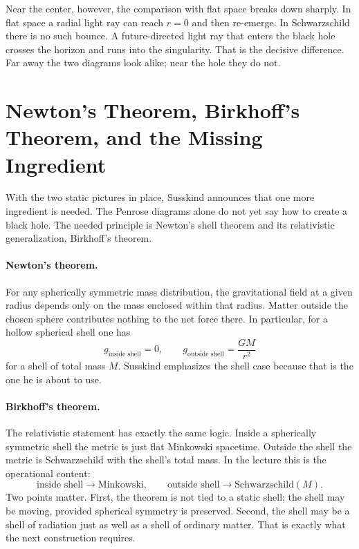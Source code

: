 Near the center, however, the comparison with flat space breaks down sharply. In flat space a radial light ray can reach \(r=0\) and then re-emerge. In Schwarzschild there is no such bounce. A future-directed light ray that enters the black hole crosses the horizon and runs into the singularity. That is the decisive difference. Far away the two diagrams look alike; near the hole they do not.

\section{Newton's Theorem, Birkhoff's Theorem, and the Missing Ingredient}

With the two static pictures in place, Susskind announces that one more ingredient is needed. The Penrose diagrams alone do not yet say how to create a black hole. The needed principle is Newton's shell theorem and its relativistic generalization, Birkhoff's theorem.

\paragraph{Newton's theorem.} For any spherically symmetric mass distribution, the gravitational field at a given radius depends only on the mass enclosed within that radius. Matter outside the chosen sphere contributes nothing to the net force there. In particular, for a hollow spherical shell one has
\begin{equation}
g_{\text{inside shell}}=0,
\qquad
g_{\text{outside shell}}=\frac{GM}{r^2}
\end{equation}
for a shell of total mass \(M\). Susskind emphasizes the shell case because that is the one he is about to use.

\paragraph{Birkhoff's theorem.} The relativistic statement has exactly the same logic. Inside a spherically symmetric shell the metric is just flat Minkowski spacetime. Outside the shell the metric is Schwarzschild with the shell's total mass. In the lecture this is the operational content:
\begin{equation}
\text{inside shell} \longrightarrow \text{Minkowski},
\qquad
\text{outside shell} \longrightarrow \text{Schwarzschild}(M).
\end{equation}
Two points matter. First, the theorem is not tied to a static shell; the shell may be moving, provided spherical symmetry is preserved. Second, the shell may be a shell of radiation just as well as a shell of ordinary matter. That is exactly what the next construction requires.

